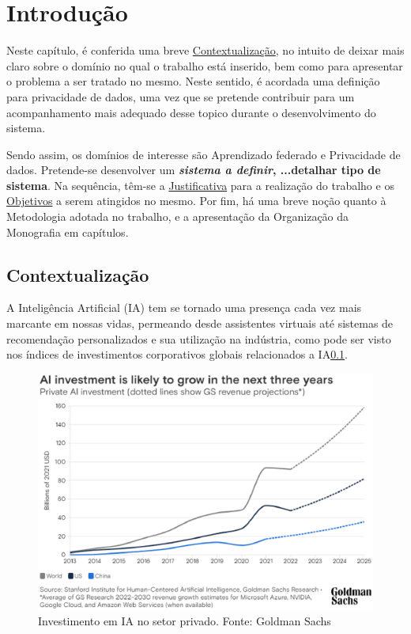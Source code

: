 \chapter*[Introdução]{Introdução}

Neste capítulo, é conferida uma breve \hyperref[sec:contextualizacao]{Contextualização}, no intuito de deixar mais claro sobre o domínio no qual o trabalho está inserido, bem como para apresentar o problema a ser tratado no mesmo. Neste sentido, é acordada uma definição para privacidade de dados, uma vez que se pretende contribuir para um acompanhamento mais adequado desse topico durante o desenvolvimento do sistema. 

Sendo assim, os domínios de interesse são Aprendizado federado e Privacidade de dados. Pretende-se desenvolver um \textbf{\emph{sistema a definir}, ...detalhar tipo de sistema}. Na sequência, têm-se a \hyperref[sec:justificativa]{Justificativa} para a realização do trabalho e os \hyperref[sec:objetivos]{Objetivos} a serem atingidos no mesmo. Por fim, há uma breve noção quanto à Metodologia adotada no trabalho, e a apresentação da Organização da Monografia em capítulos.

\section{Contextualização}
\label{sec:contextualizacao}

A Inteligência Artificial (IA) tem se tornado uma presença cada vez mais marcante em nossas vidas, permeando desde assistentes virtuais até sistemas de recomendação personalizados e sua utilização na indústria, como pode ser visto nos índices de investimentos corporativos globais relacionados a IA\ref{fig:investimentoIA}.

\begin{figure}[h]
    \centering
    \includegraphics[scale=0.6]{figuras/AIInvestiments2025.eps}
    \caption{Investimento em IA no setor privado. Fonte: Goldman Sachs \cite{goldmansachs2023}}
    \label{fig:investimentoIA}
\end{figure}

